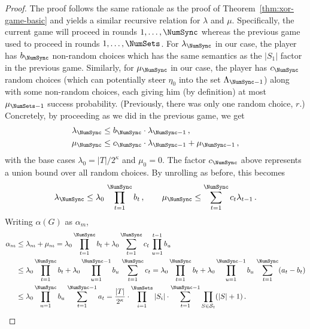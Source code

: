 \begin{proof}
The proof follows the same rationale as the proof of Theorem~\ref{thm:xor-game-basic} 
and yields a similar recursive relation for $\lambda$ and $\mu$. 
Specifically, the current game will proceed in rounds $1, \ldots, \NumSync$ whereas the previous game 
used to proceed in rounds $1, \ldots, \NumSets$.
For $\lambda_\NumSync$ in our case, the player has $b_\NumSync$ non-random choices 
which has the same semantics as the $|S_1|$ factor in the previous game. 
Similarly, for $\mu_\NumSync$ in our case, the player has $c_\NumSync$ random choices 
(which can potentially steer $\eta_0$ into the set $\Lambda_{\NumSync - 1}$) along with some 
non-random choices, each giving him (by definition) at most $\mu_{\NumSets - 1}$ success probability.
(Previously, there was only one random choice, $r$.)
Concretely, by proceeding as we did in the previous game, we get
\begin{align*}    
    \lambda_\NumSync
    &\leq 
        b_\NumSync \cdot 
        \lambda_{\NumSync - 1}
    \,, \\
    \mu_\NumSync
    &\leq 
        c_\NumSync \cdot \lambda_{\NumSync - 1} + \mu_{\NumSync - 1} 
    \,,
\end{align*}
with the base cases $\lambda_0 = |T|/2^\kappa$ and $\mu_0 = 0$. 
The factor $c_\NumSync$ above represents a union bound over all random choices.
By unrolling as before, this becomes 
\[
    \lambda_\NumSync \leq \lambda_0\,\prod_{t=1}^\NumSync b_t\,,\qquad 
    \mu_\NumSync \leq \sum_{t=1}^{\NumSync}c_t \lambda_{t-1}
    \,.
\]
Writing $\alpha(G)$ as $\alpha_m$,
\begin{align}
\alpha_m
&\leq \lambda_m + \mu_m 
= \lambda_0 \prod_{t=1}^\NumSync b_t + \lambda_0 \sum_{t=1}^\NumSync c_t\, \prod_{u = 1}^{t - 1}b_u \label{eq:gp-block-xor-general}\\
&\leq \lambda_0 \prod_{t=1}^\NumSync b_t + \lambda_0 \prod_{u = 1}^{\NumSync - 1} b_u \,\sum_{t=1}^\NumSync c_t 
= \lambda_0 \prod_{t=1}^\NumSync b_t + \lambda_0 \prod_{u = 1}^{\NumSync - 1} b_u \,\sum_{t=1}^\NumSync (a_t - b_t) \nonumber \\
&\leq \lambda_0 \prod_{u = 1}^{\NumSync} b_u \,\sum_{t=1}^{\NumSync-1} a_t 
= \frac{|T|}{2^\kappa}\cdot \prod_{i = 1}^{\NumSets} |S_i| \cdot \sum_{t=1}^{\NumSync-1} \prod_{S \in \mathcal{S}_t} (|S| + 1)
\nonumber \,.
\end{align}


\end{proof}
